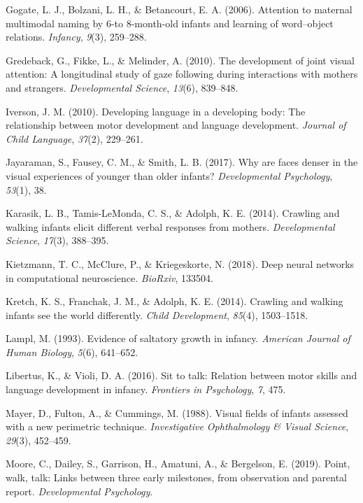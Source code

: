 \documentclass[english,man]{apa6}
\begin{document}
\hypertarget{ref-gogate2006attention}{}
Gogate, L. J., Bolzani, L. H., \& Betancourt, E. A. (2006). Attention to
maternal multimodal naming by 6-to 8-month-old infants and learning of
word--object relations. \emph{Infancy}, \emph{9}(3), 259--288.

\hypertarget{ref-gredeback2010development}{}
Gredeback, G., Fikke, L., \& Melinder, A. (2010). The development of
joint visual attention: A longitudinal study of gaze following during
interactions with mothers and strangers. \emph{Developmental Science},
\emph{13}(6), 839--848.

\hypertarget{ref-iverson2010}{}
Iverson, J. M. (2010). Developing language in a developing body: The
relationship between motor development and language development.
\emph{Journal of Child Language}, \emph{37}(2), 229--261.

\hypertarget{ref-jayaraman2017faces}{}
Jayaraman, S., Fausey, C. M., \& Smith, L. B. (2017). Why are faces
denser in the visual experiences of younger than older infants?
\emph{Developmental Psychology}, \emph{53}(1), 38.

\hypertarget{ref-karasik2014}{}
Karasik, L. B., Tamis-LeMonda, C. S., \& Adolph, K. E. (2014). Crawling
and walking infants elicit different verbal responses from mothers.
\emph{Developmental Science}, \emph{17}(3), 388--395.

\hypertarget{ref-kietzmann2018deep}{}
Kietzmann, T. C., McClure, P., \& Kriegeskorte, N. (2018). Deep neural
networks in computational neuroscience. \emph{BioRxiv}, 133504.

\hypertarget{ref-kretch2014}{}
Kretch, K. S., Franchak, J. M., \& Adolph, K. E. (2014). Crawling and
walking infants see the world differently. \emph{Child Development},
\emph{85}(4), 1503--1518.

\hypertarget{ref-lampl1993evidence}{}
Lampl, M. (1993). Evidence of saltatory growth in infancy.
\emph{American Journal of Human Biology}, \emph{5}(6), 641--652.

\hypertarget{ref-libertus2016sit}{}
Libertus, K., \& Violi, D. A. (2016). Sit to talk: Relation between
motor skills and language development in infancy. \emph{Frontiers in
Psychology}, \emph{7}, 475.

\hypertarget{ref-mayer1988}{}
Mayer, D., Fulton, A., \& Cummings, M. (1988). Visual fields of infants
assessed with a new perimetric technique. \emph{Investigative
Ophthalmology \& Visual Science}, \emph{29}(3), 452--459.

\hypertarget{ref-moore2019point}{}
Moore, C., Dailey, S., Garrison, H., Amatuni, A., \& Bergelson, E.
(2019). Point, walk, talk: Links between three early milestones, from
observation and parental report. \emph{Developmental Psychology}.
\end{document}
